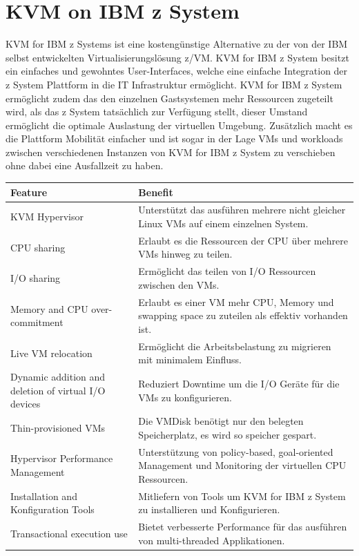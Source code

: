 \documentclass[14pt]{extreport}
\begin{document}
\newpage
\section{KVM on IBM z System}
KVM for IBM z Systems ist eine kostengünstige Alternative zu der von der IBM selbst entwickelten Virtualisierungslösung z/VM. KVM for IBM z System besitzt ein einfaches und gewohntes User-Interfaces, welche eine einfache Integration der z System Plattform in die IT Infrastruktur ermöglicht.
KVM for IBM z System ermöglicht zudem das den einzelnen Gastsystemen mehr Ressourcen zugeteilt wird, als das z System tatsächlich zur Verfügung stellt, dieser Umstand ermöglicht die optimale Auslastung der virtuellen Umgebung. Zusätzlich macht es die Plattform Mobilität einfacher und ist sogar in der Lage VMs und workloads zwischen verschiedenen Instanzen von KVM for IBM z System zu verschieben ohne dabei eine Ausfallzeit zu haben. \cite{website:ibm}
\begin{longtable}{|p{5cm}|p{10cm}|}
\hline
\textbf{Feature}                                     & \textbf{Benefit}                                                                                      \\ \hline
KVM Hypervisor                                       & Unterstützt das ausführen mehrere nicht gleicher Linux VMs auf einem einzelnen System.                  \\ \hline
CPU sharing                                          & Erlaubt es die Ressourcen der CPU über mehrere VMs hinweg zu teilen.                                   \\ \hline
I/O sharing                                          & Ermöglicht das teilen von I/O Ressourcen zwischen den VMs.                                             \\ \hline
Memory and CPU over-commitment                       & Erlaubt es einer VM mehr CPU, Memory und swapping space zu zuteilen als effektiv vorhanden ist.       \\ \hline
Live VM relocation                                   & Ermöglicht die Arbeitsbelastung zu migrieren mit minimalem Einfluss.                                  \\ \hline
Dynamic addition and deletion of virtual I/O devices & Reduziert Downtime um die I/O Geräte für die VMs zu konfigurieren.                                    \\ \hline
Thin-provisioned VMs                                 & Die VMDisk benötigt nur den belegten Speicherplatz, es wird so speicher gespart.                      \\ \hline
Hypervisor Performance Management                    & Unterstützung von policy-based, goal-oriented Management und Monitoring der virtuellen CPU Ressourcen. \\ \hline
Installation and Konfiguration Tools                 & Mitliefern von Tools um KVM for IBM z System zu installieren und Konfigurieren.                     \\ \hline
Transactional execution use                          & Bietet verbesserte Performance für das ausführen von multi-threaded Applikationen.                     \\ \hline
\end{longtable}
\end{document}
